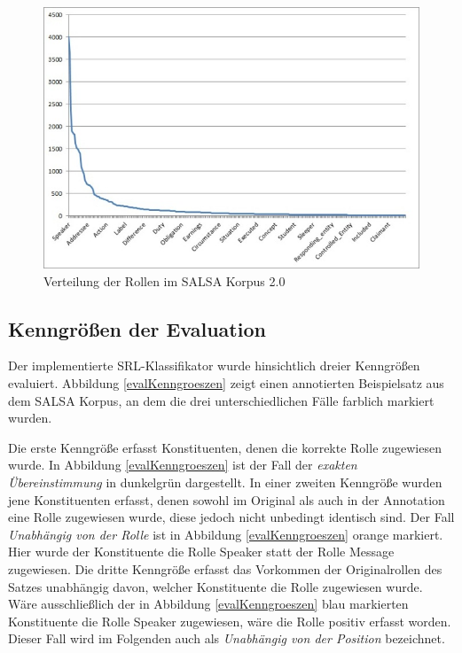 \documentclass[12pt]{article}
\begin{document}
	\begin{figure}[tb!]
		\centering
		\includegraphics[scale=0.6]{images/roleFrequency.jpg}
		\caption{Verteilung der Rollen im SALSA Korpus 2.0}
		\label{roleFrequency}
	\end{figure}

\subsection{Kenngrößen der Evaluation}

Der implementierte SRL-Klassifikator wurde hinsichtlich dreier Kenngrößen evaluiert. Abbildung \ref{evalKenngroeszen} zeigt einen annotierten Beispielsatz aus dem SALSA Korpus, an dem die drei unterschiedlichen Fälle farblich markiert wurden.

Die erste Kenngröße erfasst Konstituenten, denen die korrekte Rolle zugewiesen wurde. In Abbildung \ref{evalKenngroeszen} ist der Fall der \textit{exakten Übereinstimmung} in dunkelgrün dargestellt. 
In einer zweiten Kenngröße wurden jene Konstituenten erfasst, denen sowohl im Original als auch in der Annotation eine Rolle zugewiesen wurde, diese jedoch nicht unbedingt identisch sind. Der Fall \textit{Unabhängig von der Rolle} ist in Abbildung \ref{evalKenngroeszen} orange markiert. Hier wurde der Konstituente die Rolle Speaker statt der Rolle Message zugewiesen.
Die dritte Kenngröße erfasst das Vorkommen der Originalrollen des Satzes unabhängig davon, welcher Konstituente die Rolle zugewiesen wurde. Wäre ausschließlich der in Abbildung \ref{evalKenngroeszen} blau markierten Konstituente die Rolle Speaker zugewiesen, wäre die Rolle positiv erfasst worden. Dieser Fall wird im Folgenden auch als \textit{Unabhängig von der Position} bezeichnet.
\end{document}
